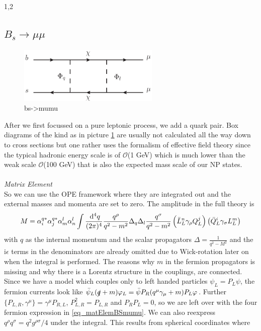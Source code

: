 \documentclass[11pt,a4paper,twoside]{article}
\numberwithin{equation}{section}
\newcommand{\ti}{\text{i}}
\begin{document}
\begin{spacing}{1,2}
\subsection{$B_s\rightarrow \mu\mu$}
\begin{figure}[t]
 \includegraphics[width=0.6\textwidth]{../pics/bsmumu.eps}
 \caption{bs->mumu}
 \label{pic_Bsmumu}
\end{figure}
After we first focussed on a pure leptonic process, we add a quark pair. Box diagrams of the kind as in picture \ref{pic_Bsmumu} are usually not calculated 
all the way down to cross sections but one rather uses the formalism of effective field theory since the typical hadronic energy scale is of
$\mathcal{O}$(1 GeV) which is much lower than the weak scale $\mathcal{O}$(100 GeV) that is also the expected mass scale of our NP states. 
\\ \\ \noindent \textit{Matrix Element}\\
\noindent So we can use 
the OPE framework where they are integrated out and the external masses and momenta are set to zero. The amplitude in the full theory is
\begin{align}
 M =\alpha_i^{q*} \alpha_j^{q*} \alpha_m^l \alpha_n^l\int \frac{\; \mathrm{d}^4 q}{(2\pi)^4} \frac{q^\rho}{q^2-m^2}\Delta_q \Delta_l \frac{q^\sigma}{q^2-m^2} \left(\bar L_L^n \gamma_\rho Q_L^j\right) \left(\bar Q_L^i \gamma_\sigma L_L^m\right)
 \label{eq_matElemBSmumu}
\end{align}
with $q$ as the internal momentum and the scalar propagators $\Delta = \frac{1}{q^2-M^2}$ and the $\ti\epsilon$ terms in the denominators are already omitted
due to Wick-rotation later on when the integral is performed. The reasons why $m$ in the fermion propagators is missing
and why there is a Lorentz structure in the couplings, are connected. Since we have a model which couples only to left handed particles $\psi_L = P_L \psi$,
the fermion currents look like $\bar \psi_L (\slashed{q}+m)\varphi_L = \bar \psi P_R (q^\mu \gamma_\mu+m) P_L\varphi$. Further
$\{P_{L,R},\gamma^\mu\} = \gamma^\mu P_{R,L}$, $P_{L,R}^2 = P_{L,R}$ and $P_R P_L = 0$, so we are left over with the four fermion expression in 
\eqref{eq_matElemBSmumu}. We can also reexpress $q^\rho q^\sigma = q^2 g^{\rho\sigma}/4$ under the integral. This results from spherical coordinates where

\end{spacing}
\end{document}
